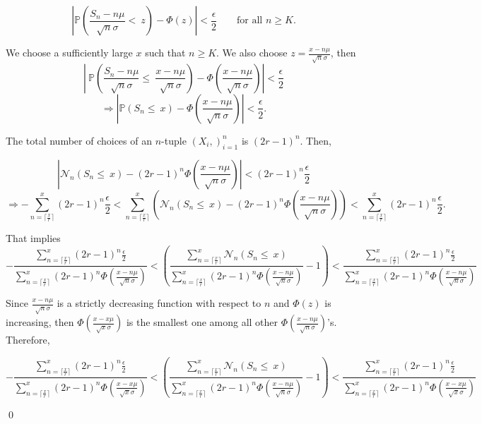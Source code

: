 \documentclass[11pt]{amsart}
\renewenvironment{proof}{{\bfseries Proof.}}{\qed}
\numberwithin{equation}{section}
\newcommand{\imp}{\Rightarrow}
\numberwithin{equation}{section}
\begin{document}
\begin{proof}
		 	\[\left|\mathbb{P}\left(\frac{S_n -n\mu}{\sqrt{n}\sigma}<~z\right)-\Phi(z)\right|<\frac{\epsilon}{2}\qquad \text{for all $n\geq K$}.\]
		 	
		 	We choose a sufficiently large $x$ such that $n\geq K$. We also choose $z=\frac{x-n\mu}{\sqrt{n}\sigma}$, then 
		 	\[
		 	\left|~\mathbb{P}\left(\frac{S_n -n\mu}{\sqrt{n}\sigma}\leq ~\frac{x-n\mu}{\sqrt{n}\sigma}\right)-\Phi\left(\frac{x-n\mu}{\sqrt{n}\sigma}\right )\right |<\frac{\epsilon}{2}
		 	\]
		 	\[
		 	\imp \left|\mathbb{P}(S_n \leq ~x)-\Phi\left(\frac{x-n\mu}{\sqrt{n}\sigma}\right)\right|<\frac{\epsilon}{2}. \]
		 	
		 	
		 	
		 	
		 	
		 	
		 	
		 	
		 	The total number of choices of an $n$-tuple $(X_i,)_{i=1}^{n}$ is $(2r-1)^{n}.$ Then,
		 	
		 
	\[\left|\mathcal{N}_{n}(S_n \leq ~x)-(2r-1)^{n}\Phi\left(\frac{x-n\mu}{\sqrt{n}\sigma}\right)\right|<(2r-1)^{n}\frac{\epsilon}{2}\]
	\[\imp -\sum_{n=\lceil \frac{x}{r}\rceil}^{x}(2r-1)^{n}\frac{\epsilon}{2}<  \sum_{n=\lceil \frac{x}{r}\rceil}^{x}\left({\mathcal{N}_{n}(S_n \leq ~x)}-(2r-1)^{n}\Phi\left(\frac{x-n\mu}{\sqrt{n}\sigma}\right)\right)< \sum_{n=\lceil \frac{x}{r}\rceil}^{x}(2r-1)^{n}\frac{\epsilon}{2}.\]
	
	That implies
	\[
	- \frac{\sum_{n=\lceil \frac{x}{r}\rceil}^{x}(2r-1)^{n}\frac{\epsilon}{2}}{\sum_{n=\lceil \frac{x}{r}\rceil}^{x}(2r-1)^{n}\Phi(\frac{x-n\mu}{\sqrt{n}\sigma})}< \left( \frac{\sum_{n=\lceil \frac{x}{r}\rceil}^{x}\mathcal{N}_{n}(S_n \leq ~x)}{\sum_{n=\lceil \frac{x}{r}\rceil}^{x}(2r-1)^{n}\Phi(\frac{x-n\mu}{\sqrt{n}\sigma})}-1\right)< \frac{\sum_{n=\lceil \frac{x}{r}\rceil}^{x}(2r-1)^{n}\frac{\epsilon}{2}}{\sum_{n=\lceil \frac{x}{r}\rceil}^{x}(2r-1)^{n}\Phi(\frac{x-n\mu}{\sqrt{n}\sigma})}
	\]
	
	Since $\frac{x-n\mu}{\sqrt{n}\sigma}$ is a strictly decreasing function with respect to $n$ and $\Phi(z)$ is increasing, then $\Phi\left(\frac{x-x\mu}{\sqrt{x}\sigma}\right)$ is the smallest one among all other $\Phi(\frac{x-n\mu}{\sqrt{n}\sigma})$'s. Therefore, 
	
	
	\[
	- \frac{\sum_{n=\lceil \frac{x}{r}\rceil}^{x}(2r-1)^{n}\frac{\epsilon}{2}}{\sum_{n=\lceil \frac{x}{r}\rceil}^{x}(2r-1)^{n}\Phi(\frac{x-x\mu}{\sqrt{x}\sigma})}< \left( \frac{\sum_{n=\lceil \frac{x}{r}\rceil}^{x}\mathcal{N}_{n}(S_n \leq ~x)}{\sum_{n=\lceil \frac{x}{r}\rceil}^{x}(2r-1)^{n}\Phi(\frac{x-n\mu}{\sqrt{n}\sigma})}-1\right)< \frac{\sum_{n=\lceil \frac{x}{r}\rceil}^{x}(2r-1)^{n}\frac{\epsilon}{2}}{\sum_{n=\lceil \frac{x}{r}\rceil}^{x}(2r-1)^{n}\Phi(\frac{x-x\mu}{\sqrt{x}\sigma})}
	\]
	

\end{proof}
\end{document}
